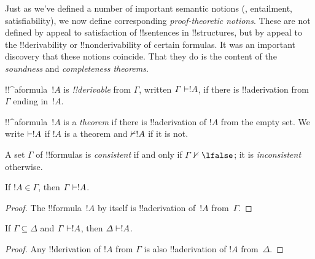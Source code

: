 \documentclass[../../../include/open-logic-section]{subfiles}
\begin{document}
      {}
      {}


\begin{explain}
Just as we've defined a number of important semantic notions
(, entailment, satisfiability), we now
define corresponding \emph{proof-theoretic notions}.  These are not
defined by appeal to satisfaction of !!{sentence}s in !!{structure}s,
but by appeal to the !!{derivability} or !!{nonderivability} of
certain formulas.  It was an important discovery that these notions
coincide.  That they do is the content of the \emph{soundness} and
\emph{completeness theorems}.
\end{explain}

\begin{defn}[!!^{derivability}]
!!^a{formula}~$!A$ is \emph{!!{derivable}} from $\Gamma$, written
$\Gamma \Proves !A$, if there is !!a{derivation} from~$\Gamma$ ending
in~$!A$.
\end{defn}

\begin{defn}[Theorems]
!!^a{formula}~$!A$ is a \emph{theorem} if there is !!a{derivation} of
$!A$ from the empty set.  We write $\Proves !A$ if $!A$ is a theorem
and $\Proves/ !A$ if it is not.
\end{defn}

\begin{defn}[Consistency]
A set $\Gamma$ of !!{formula}s is \emph{consistent} if and only if
$\Gamma\Proves/ \lfalse$; it is \emph{inconsistent} otherwise.
\end{defn}

\begin{prop}[Reflexivity]
If $!A \in \Gamma$, then $\Gamma \Proves !A$.
\end{prop}

\begin{proof}
  The !!{formula}~$!A$ by itself is !!a{derivation} of~$!A$ from~$\Gamma$.
\end{proof}

\begin{prop}[Monotonicity]
If $\Gamma \subseteq \Delta$ and $\Gamma \Proves !A$, then $\Delta
\Proves !A$.
\end{prop}

\begin{proof}
Any !!{derivation} of $!A$ from $\Gamma$ is also !!a{derivation} of
$!A$ from~$\Delta$.
\end{proof}
\end{document}
